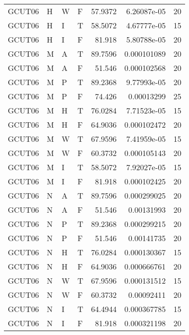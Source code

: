 \begin{table}[!htb]
{\begin{tabular}{llllrrr}
            GCUT06   & H     & W     & F          & 57.9372    & 6.26087e-05 & 20       \\
            GCUT06   & H     & I     & T          & 58.5072    & 4.67777e-05 & 15       \\
            GCUT06   & H     & I     & F          & 81.918     & 5.80788e-05 & 20       \\
            GCUT06   & M     & A     & T          & 89.7596    & 0.000101089 & 20       \\
            GCUT06   & M     & A     & F          & 51.546     & 0.000102568 & 20       \\
            GCUT06   & M     & P     & T          & 89.2368    & 9.77993e-05 & 20       \\
            GCUT06   & M     & P     & F          & 74.426     & 0.00013299  & 25       \\
            GCUT06   & M     & H     & T          & 76.0284    & 7.71523e-05 & 15       \\
            GCUT06   & M     & H     & F          & 64.9036    & 0.000102472 & 20       \\
            GCUT06   & M     & W     & T          & 67.9596    & 7.41959e-05 & 15       \\
            GCUT06   & M     & W     & F          & 60.3732    & 0.000105143 & 20       \\
            GCUT06   & M     & I     & T          & 58.5072    & 7.92027e-05 & 15       \\
            GCUT06   & M     & I     & F          & 81.918     & 0.000102425 & 20       \\
            GCUT06   & N     & A     & T          & 89.7596    & 0.000299025 & 20       \\
            GCUT06   & N     & A     & F          & 51.546     & 0.00131993  & 20       \\
            GCUT06   & N     & P     & T          & 89.2368    & 0.000299215 & 20       \\
            GCUT06   & N     & P     & F          & 51.546     & 0.00141735  & 20       \\
            GCUT06   & N     & H     & T          & 76.0284    & 0.000130367 & 15       \\
            GCUT06   & N     & H     & F          & 64.9036    & 0.000666761 & 20       \\
            GCUT06   & N     & W     & T          & 67.9596    & 0.000131512 & 15       \\
            GCUT06   & N     & W     & F          & 60.3732    & 0.00092411  & 20       \\
            GCUT06   & N     & I     & T          & 64.4944    & 0.000367785 & 15       \\
            GCUT06   & N     & I     & F          & 81.918     & 0.000321198 & 20       \\
            \hline
        \end{tabular}
    }{}
\end{table}